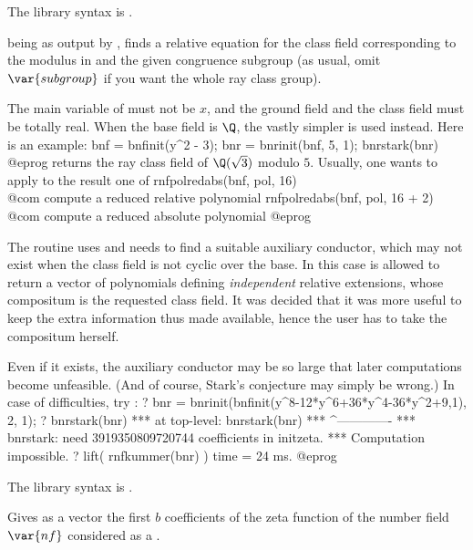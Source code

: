 The library syntax is .

\label{se:bnrstark}
 being as output by , finds a relative equation
for the class field corresponding to the modulus in  and the given
congruence subgroup (as usual, omit $\var{subgroup}$ if you want the whole ray
class group).

The main variable of  must not be $x$, and the ground field and the
class field must be totally real. When the base field is $\Q$, the vastly
simpler  is used instead. Here is an example:
\bprog
bnf = bnfinit(y^2 - 3);
bnr = bnrinit(bnf, 5, 1);
bnrstark(bnr)
@eprog\noindent
returns the ray class field of $\Q(\sqrt{3})$ modulo $5$. Usually, one wants
to apply to the result one of
\bprog
rnfpolredabs(bnf, pol, 16)     \\@com compute a reduced relative polynomial
rnfpolredabs(bnf, pol, 16 + 2) \\@com compute a reduced absolute polynomial
@eprog

The routine uses  and needs to find a suitable auxiliary
conductor, which may not exist when the class field is not cyclic over the
base. In this case  is allowed to return a vector of
polynomials defining \emph{independent} relative extensions, whose compositum
is the requested class field. It was decided that it was more useful
to keep the extra information thus made available, hence the user has to take
the compositum herself.

Even if it exists, the auxiliary conductor may be so large that later
computations become unfeasible. (And of course, Stark's conjecture may simply
be wrong.) In case of difficulties, try :
\bprog
? bnr = bnrinit(bnfinit(y^8-12*y^6+36*y^4-36*y^2+9,1), 2, 1);
? bnrstark(bnr)
  ***   at top-level: bnrstark(bnr)
  ***                 ^-------------
  *** bnrstark: need 3919350809720744 coefficients in initzeta.
  *** Computation impossible.
? lift( rnfkummer(bnr) )
time = 24 ms.
@eprog

The library syntax is .

\label{se:dirzetak}
Gives as a vector the first $b$
coefficients of the  zeta function of the number field $\var{nf}$
considered as a .

